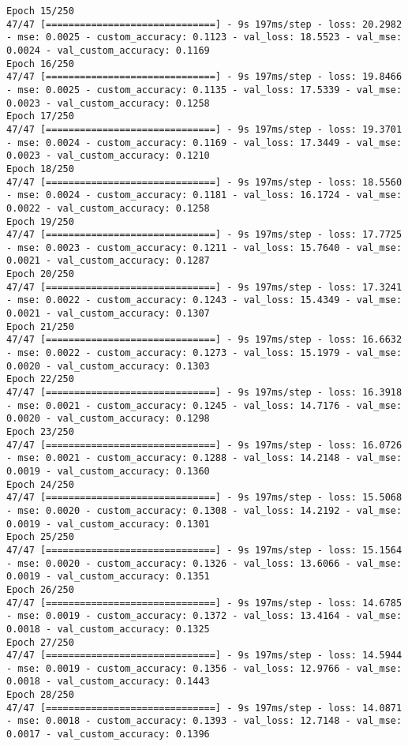 \begin{lstlisting}
Epoch 15/250
47/47 [==============================] - 9s 197ms/step - loss: 20.2982 - mse: 0.0025 - custom_accuracy: 0.1123 - val_loss: 18.5523 - val_mse: 0.0024 - val_custom_accuracy: 0.1169
Epoch 16/250
47/47 [==============================] - 9s 197ms/step - loss: 19.8466 - mse: 0.0025 - custom_accuracy: 0.1135 - val_loss: 17.5339 - val_mse: 0.0023 - val_custom_accuracy: 0.1258
Epoch 17/250
47/47 [==============================] - 9s 197ms/step - loss: 19.3701 - mse: 0.0024 - custom_accuracy: 0.1169 - val_loss: 17.3449 - val_mse: 0.0023 - val_custom_accuracy: 0.1210
Epoch 18/250
47/47 [==============================] - 9s 197ms/step - loss: 18.5560 - mse: 0.0024 - custom_accuracy: 0.1181 - val_loss: 16.1724 - val_mse: 0.0022 - val_custom_accuracy: 0.1258
Epoch 19/250
47/47 [==============================] - 9s 197ms/step - loss: 17.7725 - mse: 0.0023 - custom_accuracy: 0.1211 - val_loss: 15.7640 - val_mse: 0.0021 - val_custom_accuracy: 0.1287
Epoch 20/250
47/47 [==============================] - 9s 197ms/step - loss: 17.3241 - mse: 0.0022 - custom_accuracy: 0.1243 - val_loss: 15.4349 - val_mse: 0.0021 - val_custom_accuracy: 0.1307
Epoch 21/250
47/47 [==============================] - 9s 197ms/step - loss: 16.6632 - mse: 0.0022 - custom_accuracy: 0.1273 - val_loss: 15.1979 - val_mse: 0.0020 - val_custom_accuracy: 0.1303
Epoch 22/250
47/47 [==============================] - 9s 197ms/step - loss: 16.3918 - mse: 0.0021 - custom_accuracy: 0.1245 - val_loss: 14.7176 - val_mse: 0.0020 - val_custom_accuracy: 0.1298
Epoch 23/250
47/47 [==============================] - 9s 197ms/step - loss: 16.0726 - mse: 0.0021 - custom_accuracy: 0.1288 - val_loss: 14.2148 - val_mse: 0.0019 - val_custom_accuracy: 0.1360
Epoch 24/250
47/47 [==============================] - 9s 197ms/step - loss: 15.5068 - mse: 0.0020 - custom_accuracy: 0.1308 - val_loss: 14.2192 - val_mse: 0.0019 - val_custom_accuracy: 0.1301
Epoch 25/250
47/47 [==============================] - 9s 197ms/step - loss: 15.1564 - mse: 0.0020 - custom_accuracy: 0.1326 - val_loss: 13.6066 - val_mse: 0.0019 - val_custom_accuracy: 0.1351
Epoch 26/250
47/47 [==============================] - 9s 197ms/step - loss: 14.6785 - mse: 0.0019 - custom_accuracy: 0.1372 - val_loss: 13.4164 - val_mse: 0.0018 - val_custom_accuracy: 0.1325
Epoch 27/250
47/47 [==============================] - 9s 197ms/step - loss: 14.5944 - mse: 0.0019 - custom_accuracy: 0.1356 - val_loss: 12.9766 - val_mse: 0.0018 - val_custom_accuracy: 0.1443
Epoch 28/250
47/47 [==============================] - 9s 197ms/step - loss: 14.0871 - mse: 0.0018 - custom_accuracy: 0.1393 - val_loss: 12.7148 - val_mse: 0.0017 - val_custom_accuracy: 0.1396

\end{lstlisting}
